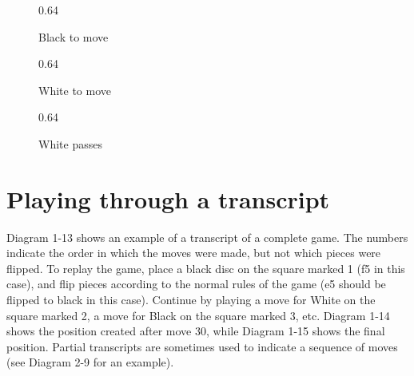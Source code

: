 \documentclass[a4paper,12pt]{book}
\newcommand{\scalefactorthreeup}{0.64}
\begin{document}
\begin{figure}[h!]
\begin{center}
\begin{minipage}[t]{.32\textwidth}
\begin{othelloboard}{\scalefactorthreeup}
\dotmarkings
{}
\end{othelloboard}
\caption{Black to move}
\end{minipage}
\begin{minipage}[t]{.32\textwidth}
\begin{othelloboard}{\scalefactorthreeup}
\dotmarkings
{}
\end{othelloboard}
\caption{White to move}
\end{minipage}
\begin{minipage}[t]{.32\textwidth}
\begin{othelloboard}{\scalefactorthreeup}
\dotmarkings
{}
\end{othelloboard}
\caption{White passes}
\end{minipage}
\end{center}
\end{figure}

\section{Playing through a transcript}

Diagram 1-13 shows an example of a transcript of a complete game. The numbers
indicate the order in which the moves were made, but not which pieces were
flipped. To replay the game, place a black disc on the square marked 1 (f5 in this
case), and flip pieces according to the normal rules of the game (e5 should be flipped
to black in this case). Continue by playing a move for White on the square marked 2,
a move for Black on the square marked 3, etc. Diagram 1-14 shows the position
created after move 30, while Diagram 1-15 shows the final position. Partial transcripts
are sometimes used to indicate a sequence of moves (see Diagram 2-9 for an
example).
\end{document}
